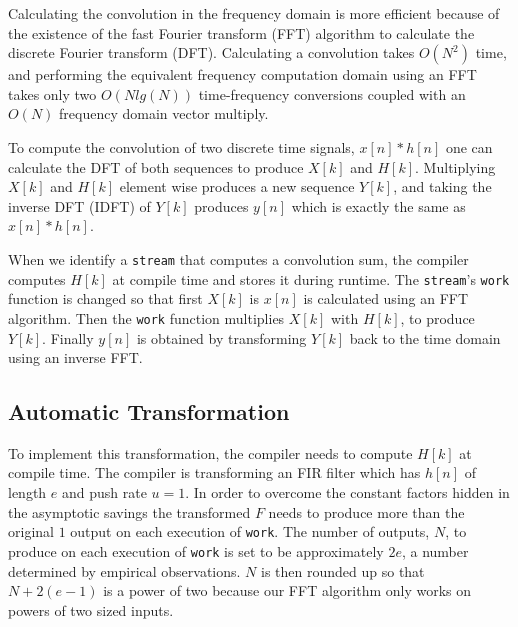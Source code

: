 Calculating the convolution in the frequency domain is more efficient because of the 
existence of the fast Fourier transform (FFT) algorithm to calculate the discrete 
Fourier transform (DFT). Calculating a convolution takes $O(N^2)$ time, and performing 
the equivalent frequency computation domain using an FFT takes only two $O(N lg(N))$ 
time-frequency conversions coupled with an $O(N)$ frequency domain vector multiply.


To compute the convolution of two discrete time signals, $x[n]*h[n]$ 
one can calculate the DFT of both sequences to produce 
$X[k]$ and $H[k]$. Multiplying $X[k]$ and $H[k]$ element wise
produces a new sequence $Y[k]$, and taking the inverse DFT (IDFT) of $Y[k]$ 
produces $y[n]$ which is exactly the same as $x[n]*h[n]$.

When we identify a {\tt stream} that computes a convolution sum, the
compiler computes $H[k]$ at compile time and stores it during runtime. 
The {\tt stream}'s {\tt work} function is changed so that first $X[k]$ is 
$x[n]$ is calculated using an FFT algorithm. Then the {\tt work} function 
multiplies $X[k]$ with $H[k]$, to produce $Y[k]$. Finally $y[n]$ is obtained by
transforming $Y[k]$ back to the time domain using an inverse FFT.

\subsection{Automatic Transformation}

To implement this transformation, the compiler needs to compute $H[k]$ at
compile time. The compiler is transforming an FIR filter which has $h[n]$ of length $e$
and push rate $u=1$.
In order to overcome the constant factors hidden in the asymptotic savings
the transformed $F$ needs to produce more than the original $1$ output on each
execution of {\tt work}. The number of outputs, $N$, to produce on each 
execution of {\tt work} is set to be approximately $2e$, a number determined
by empirical observations. $N$ is then rounded up so that $N+2(e-1)$ is a power of two 
because our FFT algorithm only works on powers of two sized inputs. 

